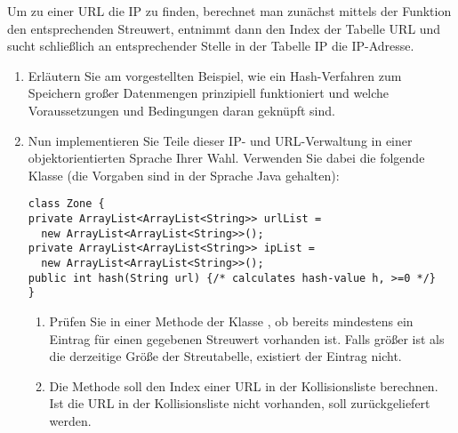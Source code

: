 \documentclass{lehramt-informatik-aufgabe}
\begin{document}
\noindent
Um zu einer URL die IP zu finden, berechnet man zunächst mittels der
Funktion  den entsprechenden Streuwert, entnimmt dann den
Index der Tabelle URL und sucht schließlich an entsprechender Stelle in
der Tabelle IP die IP-Adresse.

\begin{enumerate}


\item Erläutern Sie am vorgestellten Beispiel, wie ein Hash-Verfahren
zum Speichern großer Datenmengen prinzipiell funktioniert und welche
Voraussetzungen und Bedingungen daran geknüpft sind.


\item Nun implementieren Sie Teile dieser IP- und URL-Verwaltung in
einer objektorientierten Sprache Ihrer Wahl. Verwenden Sie dabei die
folgende Klasse (die Vorgaben sind in der Sprache Java gehalten):

\begin{verbatim}
class Zone {
private ArrayList<ArrayList<String>> urlList =
  new ArrayList<ArrayList<String>>();
private ArrayList<ArrayList<String>> ipList =
  new ArrayList<ArrayList<String>>();
public int hash(String url) {/* calculates hash-value h, >=0 */}
}
\end{verbatim}

\begin{enumerate}

\item Prüfen Sie in einer Methode  der
Klasse , ob bereits mindestens ein Eintrag für einen
gegebenen Streuwert vorhanden ist. Falls  größer ist als die
derzeitige Größe der Streutabelle, existiert der Eintrag nicht.

\begin{liAntwort}
\end{liAntwort}


\item Die Methode  soll den Index einer URL in der Kollisionsliste berechnen. Ist
die URL in der Kollisionsliste nicht vorhanden, soll 
zurückgeliefert werden.

\begin{liAntwort}
\end{liAntwort}


\end{enumerate}
\end{enumerate}
\end{document}
